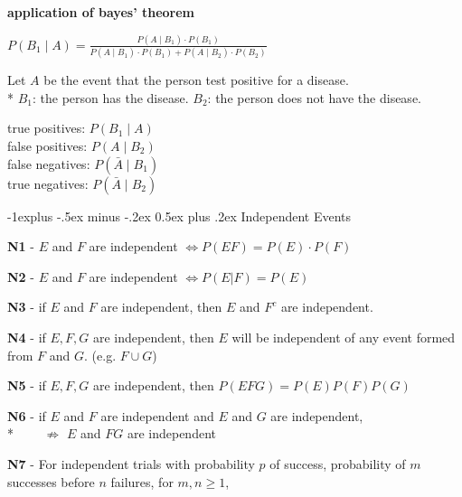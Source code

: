 \documentclass[10pt, landscape]{article}
\makeatletter
\renewcommand{\subsection}{\@startsection{subsection}{2}{0mm}%
  {-1explus -.5ex minus -.2ex}%
  {0.5ex plus .2ex}%
{\normalfont\normalsize\bfseries}}
\makeatother
\begin{document}
\begin{multicols*}{3}
  \textbf{application of bayes' theorem}

  \begin{tightcenter}
    $P(B_1 \mid A) = \frac{P(A \mid B_1) \cdot P(B_1)}{P(A \mid B_1) \cdot P(B_1) + P(A \mid B_2) \cdot P(B_2)}$
  \end{tightcenter}

  Let $A$ be the event that the person test positive for a disease.
  \\* $B_1$: the person has the disease. $B_2$: the person does not have the disease.
  \begin{tightcenter}
    \vspace*{-0.5\multicolsep}
    \begin{multicols}{2}
      true positives: $P(B_1\mid A)$
      \\ false positives: $P(A \mid B_2)$
      \\ false negatives: $P(\bar{A} \mid B_1)$
      \\ true negatives: $P(\bar{A} \mid B_2)$
    \end{multicols}
  \end{tightcenter}

  \subsection{Independent Events}

  \textbf{N1} - $E$ and $F$ are independent $\iff P(EF) = P(E) \cdot P(F) \quad$ 

  \textbf{N2} - $E$ and $F$ are independent $\iff P(E \vert F) = P(E)$

  \textbf{N3} - if $E$ and $F$ are independent, then $E$ and $F^c$ are independent.

  \textbf{N4} - if $E, F, G$ are independent, then $E$ will be independent of any event formed from $F$ and $G$. (e.g. $F\cup G$)

  \textbf{N5} - if $E, F, G$ are independent, then $ P(EFG) = P(E)P(F)P(G) $

  \textbf{N6} - if $ E $ and $ F $ are independent and $ E $ and $ G $ are independent, 
  \\* $\quad\quad \not\Rightarrow $  $ E $ and $ FG $ are independent

  \textbf{N7} - For independent trials with probability $ p $ of success, probability of $ m $ successes before $ n $ failures, 
  for $ m, n \geq 1 $,


\end{multicols*}
\end{document}
